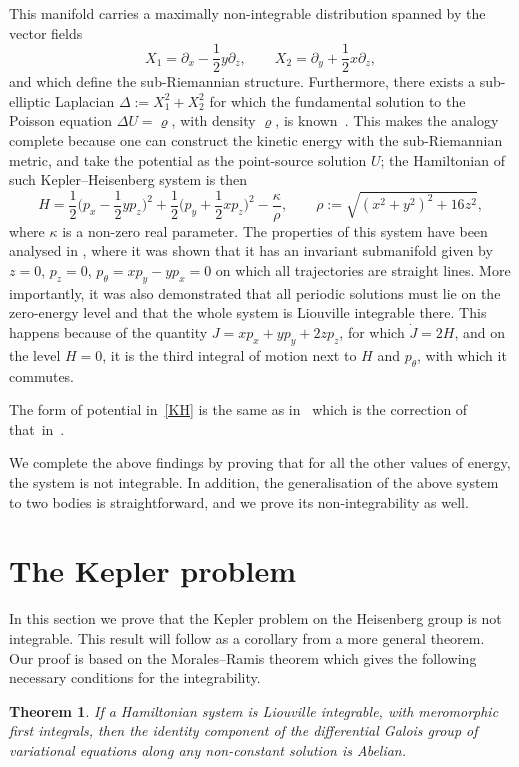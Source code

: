 \documentclass[11pt]{article}
\numberwithin{equation}{section}
\numberwithin{equation}{section}
\newtheorem{Theorem}{Theorem}[section]
\begin{document}
This manifold carries a maximally non-integrable distribution spanned
by the vector fields
\begin{equation*}
 X_1 = \partial_x - \frac12 y\partial_z,\qquad
 X_2 = \partial_y + \frac12 x\partial_z,
\end{equation*}
and which define the sub-Riemannian structure. Furthermore, there
exists a sub-elliptic Laplacian $\Delta:=X_1^2+X_2^2$ for which the
fundamental solution to the Poisson equation $\Delta U=\varrho$, with density $\varrho$, is known~\cite{Folland}. This makes the analogy complete because one can
construct the kinetic energy with the sub-Riemannian metric, and take
the potential as the point-source solution $U$;
the Hamiltonian of such Kepler--Heisenberg system is then
\begin{equation}
 \label{KH}
 H = \frac12 \bigg(p_x - \frac12 y p_z\bigg)^2 + \frac12\bigg(p_y+\frac12 x p_z\bigg)^2
 - \frac{\kappa}{\rho}, \qquad
 \rho:=\sqrt{(x^2+y^2)^2+{16}z^2},
\end{equation}
where $\kappa$ is a non-zero real parameter. The properties of this
system have been analysed in \cite{dots, 1,2}, where it was shown that it
has an invariant submanifold given by $z=0$, $p_z=0$,
$p_{\theta} = x p_y -y p_x=0$ on which all trajectories are straight
lines. More importantly, it was also demonstrated that all periodic
solutions must lie on the zero-energy level and that the whole system
is Liouville integrable there. This happens because of the quantity
$J=x p_x+ y p_y +2 z p_z$, for which $\dot{J} = 2H$, and on the level
$H=0$, it is the third integral of motion next to $H$ and
$p_{\theta}$, with which it commutes.
\begin{Remark}\label{rem1}
 The form of potential in~\eqref{KH} is the same as in~\cite{dots} which is the correction of that~in~\cite{1}.
\end{Remark}
We complete the above findings by proving that for all the other
values of energy, the system is not integrable. In addition, the generalisation of the above system to two bodies is straightforward, and we prove its non-integrability as well.


\section{The Kepler problem}

In this section we prove that the Kepler problem on the Heisenberg group is not integrable.
This result will follow as a corollary from a more general theorem.
Our proof is based on the Morales--Ramis theorem \cite{Morales:01::b1} which gives
the following necessary conditions for the integrability.
\begin{Theorem} \label{thm:MoRa}
 If a Hamiltonian system is Liouville integrable, with meromorphic
 first integrals, then the identity component of the differential
 Galois group of variational equations along any non-constant
 solution is Abelian.
\end{Theorem}
\end{document}
